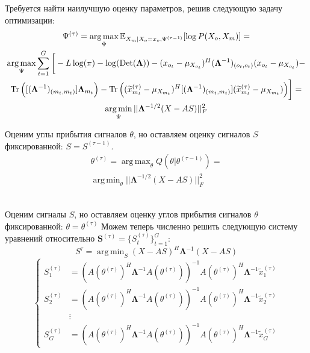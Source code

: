 \documentclass[11pt]{article}
\newcommand{\Expect}{\mathbb{E}}
\DeclareMathOperator*{\argmax}{arg\,max}
\DeclareMathOperator*{\argmin}{arg\,min}
\DeclareMathOperator{\Det}{Det}
\begin{document}
\begin{center}
\fontsize{14}{18}\selectfont {}
\end{center}
Требуется найти наилучшую оценку параметров, решив следующую задачу оптимизации:
\begin{equation*}
\begin{gathered}
\Psi^{(\tau)}=\argmax_{\Psi} \Expect_{X_m|X_o=x_o, \Psi^{(\tau-1)}}[\log P(X_o, X_m)] =\\
\argmax_{\Psi}  \sum_{t=1}^G \bigg[ -L \log(\pi) - \log (\Det(\mathbf{\Lambda})) - (x_{o_t}-\mu_{X_{o_t}})^H (\mathbf{\Lambda}^{-1})_{(o_t, o_t)}(x_{o_t}-\mu_{X_{o_t}}) -  \\ \Tr \Big( [(\mathbf{\Lambda}^{-1})_{(m_t, m_t)}]\mathbf{\Lambda}_{m_t} \Big) - \Tr \Big((\widetilde{x}_{m_t}^{(\tau)} - \mu_{X_{m_t}})^H[(\mathbf{\Lambda}^{-1})_{(m_t, m_t)}](\widetilde{x}_{m_t}^{(\tau)} - \mu_{X_{m_t}}) \Big)  \bigg] = \\
\argmin_{\Psi} ||\mathbf{\Lambda}^{-1/2}(X-AS)||_F^2
\end{gathered}
\end{equation*}
\begin{center}
\fontsize{14}{18}\selectfont {}
\end{center}
Оценим углы прибытия сигналов $\theta$, но оставляем оценку сигналов $S$ фиксированной: $S = S^{(\tau-1)}$.
\begin{equation*}
\begin{gathered}
\theta^{(\tau)}= \argmax_{\theta} Q(\theta | \theta^{(\tau-1)}) = \\
\argmin_{\theta} ||\mathbf{\Lambda}^{-1/2}(X-AS)||_F^2
\end{gathered}
\end{equation*}
\\
\begin{center}
\fontsize{14}{18}\selectfont {}
\end{center}
Оценим сигналы $S$, но оставляем оценку углов прибытия сигналов $\theta$ фиксированной: $\theta = \theta^{(\tau)}$
Можем теперь численно решить следующую систему уравнений относительно $\mathbf{S}^{(\tau)}=\{S_t^{(\tau)}\}_{t=1}^G$:
\begin{equation}
S^{\tau} = \argmin_S(X-AS)^H\mathbf{\Lambda}^{-1}(X-AS)
\end{equation}
\begin{equation}
\left\{
\begin{aligned}
S_1^{(\tau)} &= (A(\theta^{(\tau)})^H \mathbf{\Lambda}^{-1} A(\theta^{(\tau)}))^{-1}A(\theta^{(\tau)})^H \mathbf{\Lambda}^{-1}  \widetilde{x}_1^{(\tau)} \\
S_2^{(\tau)} &= (A(\theta^{(\tau)})^H \mathbf{\Lambda}^{-1} A(\theta^{(\tau)}))^{-1}A(\theta^{(\tau)})^H \mathbf{\Lambda}^{-1}  \widetilde{x}_2^{(\tau)} \\
&\vdots \\
S_G^{(\tau)} &= (A(\theta^{(\tau)})^H \mathbf{\Lambda}^{-1} A(\theta^{(\tau)}))^{-1}A(\theta^{(\tau)})^H \mathbf{\Lambda}^{-1}  \widetilde{x}_G^{(\tau)}
\end{aligned}
\right.
\end{equation}
\end{document}

